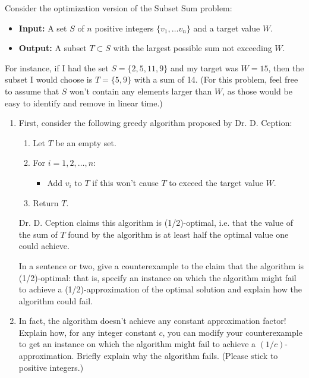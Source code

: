 \documentclass[12 pt, letterpaper]{hmcpset}
\begin{document}
\begin{problem}
	Consider the optimization version of the Subset Sum problem: 
\begin{itemize}
    \item \textbf{Input:} A set $S$ of $n$ positive integers $\{v_1, \dots v_n\}$ and a target value $W$.
    \item \textbf{Output:} A subset $T \subset S$ with the largest possible sum not exceeding $W$.
\end{itemize}
For instance, if I had the set $S = \{2, 5, 11, 9\}$ and my target was $W = 15$, then the subset I
would choose is $T = \{5, 9\}$ with a sum of 14. (For this problem, feel free to
assume that $S$ won't contain any elements larger than $W$, as those would be easy
to identify and remove in linear time.)

\begin{enumerate}
    \item First, consider the following greedy algorithm proposed by Dr. D.
    Ception: 
    \begin{enumerate}[label = (\arabic*)]
        \item Let $T$ be an empty set.
        \item For $i = 1, 2, \dots, n$:
        \begin{itemize}
            \item Add $v_i$ to $T$ if this won't cause $T$ to exceed the target value $W$.
        \end{itemize}
        \item Return $T$.
    \end{enumerate}
    Dr. D. Ception claims this algorithm is (1/2)-optimal, i.e. that the value of the sum of $T$ found by the algorithm is at least half the optimal value
    one could achieve. 
    
    In a sentence or two, give a counterexample to the claim that the algorithm is (1/2)-optimal: that is, specify an instance on which the algorithm might fail to achieve a (1/2)-approximation of the optimal solution and explain how the algorithm could fail.
    
    \item In fact, the algorithm doesn't achieve any constant approximation factor! Explain how, for any integer constant $c$, you can modify your counterexample to get an instance on which the algorithm might fail to achieve a $(1/c)$-approximation. Briefly explain why the algorithm fails. (Please stick to positive integers.)


\end{enumerate}
\end{problem}
\end{document}
